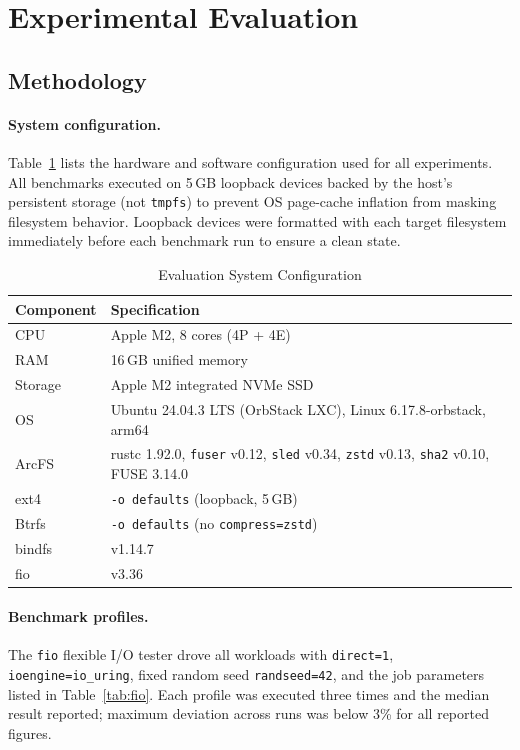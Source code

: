 \documentclass[5p,times]{elsarticle}
\begin{document}
\section{Experimental Evaluation}
\label{sec:eval}

\subsection{Methodology}

\paragraph{System configuration.}
Table~\ref{tab:sysconfig} lists the hardware and software configuration
used for all experiments.  All benchmarks executed on 5\,GB loopback
devices backed by the host's persistent storage (not \texttt{tmpfs}) to
prevent OS page-cache inflation from masking filesystem behavior.
Loopback devices were formatted with each target filesystem immediately
before each benchmark run to ensure a clean state.

\begin{table}[t]
\caption{Evaluation System Configuration}
\label{tab:sysconfig}
\centering
\renewcommand{\arraystretch}{1.2}
\footnotesize
\begin{tabular}{lp{10cm}}
\toprule
\textbf{Component} & \textbf{Specification} \\
\midrule
CPU     & Apple M2, 8 cores (4P + 4E) \\
RAM     & 16\,GB unified memory \\
Storage & Apple M2 integrated NVMe SSD \\
OS      & Ubuntu 24.04.3 LTS (OrbStack LXC), Linux 6.17.8-orbstack, arm64 \\
\midrule
ArcFS   & rustc 1.92.0, \texttt{fuser} v0.12, \texttt{sled} v0.34,
          \texttt{zstd} v0.13, \texttt{sha2} v0.10, FUSE 3.14.0 \\
ext4    & \texttt{-o defaults} (loopback, 5\,GB) \\
Btrfs   & \texttt{-o defaults} (no \texttt{compress=zstd}) \\
bindfs  & v1.14.7 \\
fio     & v3.36 \\
\bottomrule
\end{tabular}
\end{table}

\paragraph{Benchmark profiles.}
The \texttt{fio} flexible I/O tester drove all workloads with
\texttt{direct=1}, \texttt{ioengine=io\_uring}, fixed random seed
\texttt{randseed=42}, and the job parameters listed in
Table~\ref{tab:fio}.  Each profile was executed three times and the
median result reported; maximum deviation across runs was below 3\%
for all reported figures.
\end{document}
